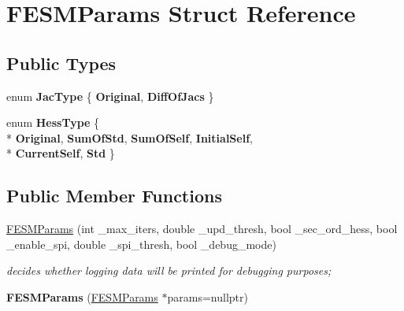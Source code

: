 \hypertarget{structFESMParams}{\section{F\-E\-S\-M\-Params Struct Reference}
\label{structFESMParams}
}
\subsection*{Public Types}
\begin{DoxyCompactItemize}
\item 
enum {\bfseries Jac\-Type} \{ {\bfseries Original}, 
{\bfseries Diff\-Of\-Jacs}
 \}
\item 
enum {\bfseries Hess\-Type} \{ \\*
{\bfseries Original}, 
{\bfseries Sum\-Of\-Std}, 
{\bfseries Sum\-Of\-Self}, 
{\bfseries Initial\-Self}, 
\\*
{\bfseries Current\-Self}, 
{\bfseries Std}
 \}
\end{DoxyCompactItemize}
\subsection*{Public Member Functions}
\begin{DoxyCompactItemize}
\item 
\hyperlink{structFESMParams_a57a82c5ffa65057e1d238ff1854a4c89}{F\-E\-S\-M\-Params} (int \-\_\-max\-\_\-iters, double \-\_\-upd\-\_\-thresh, bool \-\_\-sec\-\_\-ord\-\_\-hess, bool \-\_\-enable\-\_\-spi, double \-\_\-spi\-\_\-thresh, bool \-\_\-debug\-\_\-mode)
\begin{DoxyCompactList}\small\item\em decides whether logging data will be printed for debugging purposes; \end{DoxyCompactList}\item 
\hypertarget{structFESMParams_a3016464835a07fe2813e7ee1bb9e861b}{{\bfseries F\-E\-S\-M\-Params} (\hyperlink{structFESMParams}{F\-E\-S\-M\-Params} $\ast$params=nullptr)}\label{structFESMParams_a3016464835a07fe2813e7ee1bb9e861b}

\end{DoxyCompactItemize}
